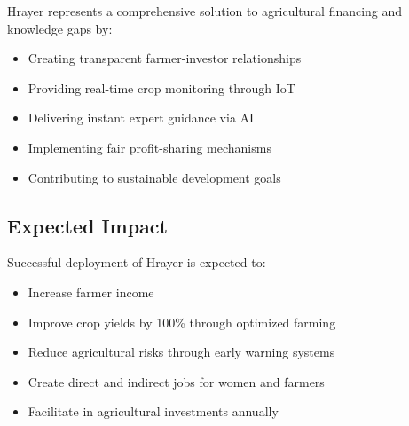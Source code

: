 \documentclass[9pt,twocolumn,twoside]{article}
\begin{document}
Hrayer represents a comprehensive solution to agricultural financing and knowledge gaps by:

\begin{itemize}
  \item Creating transparent farmer-investor relationships
  \item Providing real-time crop monitoring through IoT
  \item Delivering instant expert guidance via AI
  \item Implementing fair profit-sharing mechanisms
  \item Contributing to sustainable development goals
\end{itemize}

\subsection{Expected Impact}

Successful deployment of Hrayer is expected to:

\begin{itemize}
  \item Increase farmer income
  \item Improve crop yields by 100\% through optimized farming
  \item Reduce agricultural risks through early warning systems
  \item Create direct and indirect jobs for women and farmers
  \item Facilitate in agricultural investments annually
\end{itemize}
\end{document}
